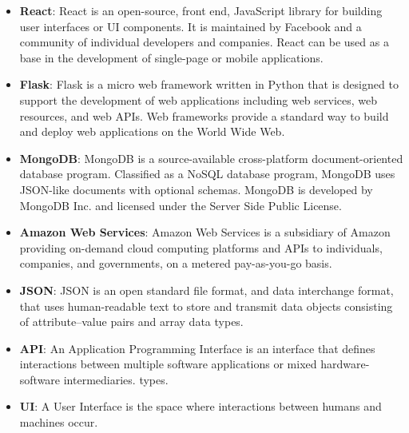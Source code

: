 \documentclass[12pt, a4]{report}
\begin{document}
\newpage
{}
\begin{itemize}
    \item \textbf{React}: React is an open-source, front end, JavaScript library for building user interfaces or UI components. It is maintained by Facebook and a community of individual developers and companies. React can be used as a base in the development of single-page or mobile applications.
    \item \textbf{Flask}: Flask is a micro web framework written in Python that is designed to support the development of web applications including web services, web resources, and web APIs. Web frameworks provide a standard way to build and deploy web applications on the World Wide Web.
    \item \textbf{MongoDB}: MongoDB is a source-available cross-platform document-oriented database program. Classified as a NoSQL database program, MongoDB uses JSON-like documents with optional schemas. MongoDB is developed by MongoDB Inc. and licensed under the Server Side Public License.
    \item \textbf{Amazon Web Services}: Amazon Web Services is a subsidiary of Amazon providing on-demand cloud computing platforms and APIs to individuals, companies, and governments, on a metered pay-as-you-go basis.
    \item \textbf{JSON}: JSON is an open standard file format, and data interchange format, that uses human-readable text to store and transmit data objects consisting of attribute–value pairs and array data types.
    \item \textbf{API}: An Application Programming Interface is an interface that defines interactions between multiple software applications or mixed hardware-software intermediaries. types.
    \item \textbf{UI}: A User Interface is the space where interactions between humans and machines occur.
\end{itemize}
\end{document}
